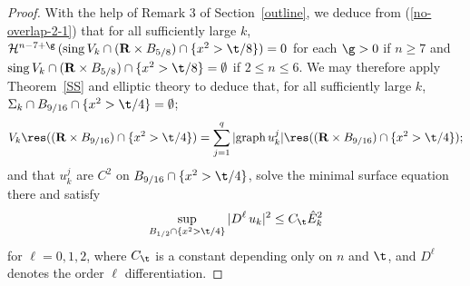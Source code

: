 \documentclass[a4paper,11pt]{amsart}
\begin{document}
\begin{proof}
With the help of Remark 3 of Section~\ref{outline}, we deduce from (\ref{no-overlap-2-1}) that for all sufficiently large $k$,  ${\mathcal H}^{n-7 +\g} \, ({\rm sing} \, V_{k} \cap ({\mathbf R} \times B_{5/8}) \cap 
\{x^{2} > \t/8\}) = 0$ for each $\g >0$ if $n \geq 7$ and ${\rm sing} \, V_{k} \cap ({\mathbf R} \times B_{5/8}) \cap \{x^{2} > \t/8\} = \emptyset$ if $2 \leq n \leq 6.$ We may therefore apply Theorem~\ref{SS} and elliptic theory to deduce that, for all sufficiently large $k$, $\Sigma_{k} \cap B_{9/16} \cap \{x^{2} > \t/4\} = \emptyset$; 
\begin{equation}\label{no-overlap-3}
 V_{k} \res(({\mathbf R} \times B_{9/16}) \cap \{x^{2} > \t/4\}) =   \sum_{j=1}^{q} |{\rm graph} \, u_{k}^{j}| \res 
(({\mathbf R} \times B_{9/16}) \cap \{x^{2} > \t/4\});
\end{equation}
and that $u_{k}^{j}$ are $C^{2}$ on $B_{9/16} \cap \{x^{2} > \t/4\}$, solve the minimal surface equation there and satisfy
\begin{equation}\label{no-overlap-4}
\sup_{B_{1/2}\cap \{x^{2} >\t/4\}} |D^{\ell} \, u_{k}|^{2} \leq C_{\t}{\hat E}_{k}^{2}
\end{equation}
for $\ell = 0, 1, 2$, where $C_{\t}$ is a constant depending only on $n$ and $\t$, 
and $D^{\ell}$ denotes the order $\ell$ differentiation.


\end{proof}
\end{document}
